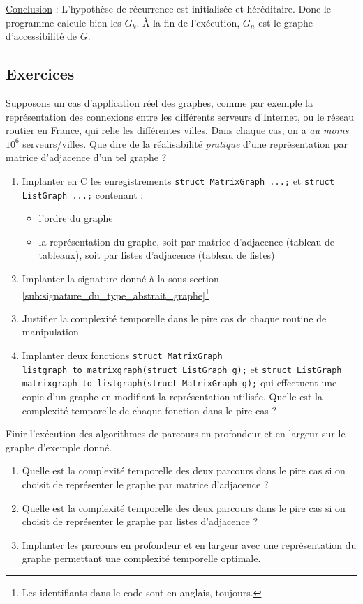 \documentclass[../../../main.tex]{subfiles}
\begin{document}
\underline{Conclusion} : L'hypothèse de récurrence est initialisée et héréditaire. Donc le programme calcule bien les $G_k$. À la fin de l'exécution, $G_n$ est le graphe d'accessibilité de $G$.
\subsection{Exercices}
 Supposons un cas d'application réel des graphes, comme par exemple la représentation des connexions entre les différents serveurs d'Internet, ou le réseau routier en France, qui relie les différentes villes. Dans chaque cas, on a \textit{au moins} $10^6$ serveurs/villes. Que dire de la réalisabilité \textit{pratique} d'une représentation par matrice d'adjacence d'un tel graphe ?

\begin{enumerate}
	\item Implanter en C les enregistrements \texttt{struct MatrixGraph {...};} et \texttt{struct ListGraph {...};} contenant :
	\begin{itemize}
		\item l'ordre du graphe
		\item la représentation du graphe, soit par matrice d'adjacence (tableau de tableaux), soit par listes d'adjacence (tableau de listes)
	\end{itemize}
	\item Implanter la signature donné à la sous-section \ref{sub:signature_du_type_abstrait_graphe}\footnote{Les identifiants dans le code sont en anglais, toujours.}
	\item Justifier la complexité temporelle dans le pire cas de chaque routine de manipulation
	\item Implanter deux fonctions \texttt{struct MatrixGraph listgraph_to_matrixgraph(struct ListGraph g);} et \texttt{struct ListGraph matrixgraph_to_listgraph(struct MatrixGraph g);} qui effectuent une copie d'un graphe en modifiant la représentation utilisée. Quelle est la complexité temporelle de chaque fonction dans le pire cas ?
\end{enumerate}
 Finir l'exécution des algorithmes de parcours en profondeur et en largeur sur le graphe d'exemple donné.

\begin{enumerate}
	\item Quelle est la complexité temporelle des deux parcours dans le pire cas si on choisit de représenter le graphe par matrice d'adjacence ?
	\item Quelle est la complexité temporelle des deux parcours dans le pire cas si on choisit de représenter le graphe par listes d'adjacence ?
	\item Implanter les parcours en profondeur et en largeur avec une représentation du graphe permettant une complexité temporelle optimale.
\end{enumerate}
\end{document}
